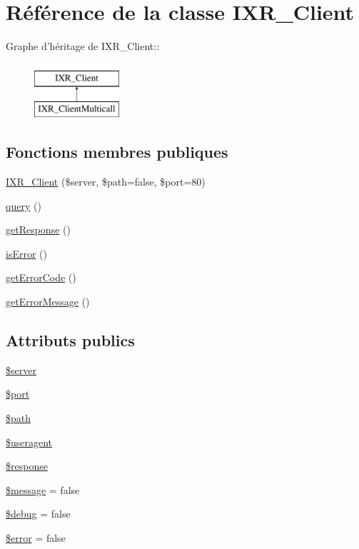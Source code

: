 \hypertarget{classIXR__Client}{
\section{R\'{e}f\'{e}rence de la classe IXR\_\-Client}
\label{classIXR__Client}
}
Graphe d'h\'{e}ritage de IXR\_\-Client::\begin{figure}[H]
\begin{center}
\leavevmode
\includegraphics[height=2cm]{classIXR__Client}
\end{center}
\end{figure}
\subsection*{Fonctions membres publiques}
\begin{CompactItemize}
\item 
\hyperlink{classIXR__Client_a0}{IXR\_\-Client} (\$server, \$path=false, \$port=80)
\item 
\hyperlink{classIXR__Client_a1}{query} ()
\item 
\hyperlink{classIXR__Client_a2}{get\-Response} ()
\item 
\hyperlink{classIXR__Client_a3}{is\-Error} ()
\item 
\hyperlink{classIXR__Client_a4}{get\-Error\-Code} ()
\item 
\hyperlink{classIXR__Client_a5}{get\-Error\-Message} ()
\end{CompactItemize}
\subsection*{Attributs publics}
\begin{CompactItemize}
\item 
\hyperlink{classIXR__Client_o0}{\$server}
\item 
\hyperlink{classIXR__Client_o1}{\$port}
\item 
\hyperlink{classIXR__Client_o2}{\$path}
\item 
\hyperlink{classIXR__Client_o3}{\$useragent}
\item 
\hyperlink{classIXR__Client_o4}{\$response}
\item 
\hyperlink{classIXR__Client_o5}{\$message} = false
\item 
\hyperlink{classIXR__Client_o6}{\$debug} = false
\item 
\hyperlink{classIXR__Client_o7}{\$error} = false
\end{CompactItemize}



